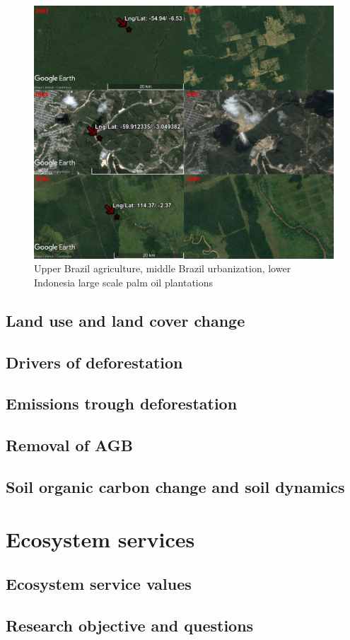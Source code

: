 	\begin{figure}[ht]
		\centering
		\includegraphics[scale=0.6]{img/deforestation_examples}
		\caption[Deforestation examples]{Upper Brazil agriculture, middle Brazil urbanization, lower Indonesia large scale palm oil plantations}
		\label{fig:deforestationexamples}
	\end{figure}

	\subsection{Land use and land cover change}
		\lipsum[1-2]
	\subsection{Drivers of deforestation}
		\lipsum[1-2]
	\subsection{Emissions trough deforestation}
		\lipsum[1-2]
	\subsection{Removal of AGB}
		\lipsum[1-2]
	\subsection{Soil organic carbon change and soil dynamics}
		\lipsum[1-2]

\section{Ecosystem services}
\label{sec:ecosystem_services}

	\subsection{Ecosystem service values}
		\lipsum[1-2]
	\subsection{Research objective and questions}
		\lipsum[1-2]
